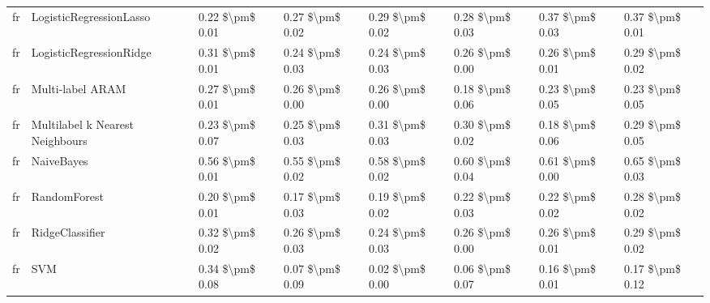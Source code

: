 \begin{tabular}{llllllll}
      fr &         LogisticRegressionLasso &     0.22 \$\textbackslash pm\$ 0.01 &           0.27 \$\textbackslash pm\$ 0.02 &       0.29 \$\textbackslash pm\$ 0.02 &        0.28 \$\textbackslash pm\$ 0.03 &                         0.37 \$\textbackslash pm\$ 0.03 &     0.37 \$\textbackslash pm\$ 0.01 \\
      fr &         LogisticRegressionRidge &     0.31 \$\textbackslash pm\$ 0.01 &           0.24 \$\textbackslash pm\$ 0.03 &       0.24 \$\textbackslash pm\$ 0.03 &        0.26 \$\textbackslash pm\$ 0.00 &                         0.26 \$\textbackslash pm\$ 0.01 &     0.29 \$\textbackslash pm\$ 0.02 \\
      fr &                Multi-label ARAM &     0.27 \$\textbackslash pm\$ 0.01 &           0.26 \$\textbackslash pm\$ 0.00 &       0.26 \$\textbackslash pm\$ 0.00 &        0.18 \$\textbackslash pm\$ 0.06 &                         0.23 \$\textbackslash pm\$ 0.05 &     0.23 \$\textbackslash pm\$ 0.05 \\
      fr & Multilabel k Nearest Neighbours &     0.23 \$\textbackslash pm\$ 0.07 &           0.25 \$\textbackslash pm\$ 0.03 &       0.31 \$\textbackslash pm\$ 0.03 &        0.30 \$\textbackslash pm\$ 0.02 &                         0.18 \$\textbackslash pm\$ 0.06 &     0.29 \$\textbackslash pm\$ 0.05 \\
      fr &                      NaiveBayes &     0.56 \$\textbackslash pm\$ 0.01 &           0.55 \$\textbackslash pm\$ 0.02 &       0.58 \$\textbackslash pm\$ 0.02 &        0.60 \$\textbackslash pm\$ 0.04 &                         0.61 \$\textbackslash pm\$ 0.00 &     0.65 \$\textbackslash pm\$ 0.03 \\
      fr &                    RandomForest &     0.20 \$\textbackslash pm\$ 0.01 &           0.17 \$\textbackslash pm\$ 0.03 &       0.19 \$\textbackslash pm\$ 0.02 &        0.22 \$\textbackslash pm\$ 0.03 &                         0.22 \$\textbackslash pm\$ 0.02 &     0.28 \$\textbackslash pm\$ 0.02 \\
      fr &                 RidgeClassifier &     0.32 \$\textbackslash pm\$ 0.02 &           0.26 \$\textbackslash pm\$ 0.03 &       0.24 \$\textbackslash pm\$ 0.03 &        0.26 \$\textbackslash pm\$ 0.00 &                         0.26 \$\textbackslash pm\$ 0.01 &     0.29 \$\textbackslash pm\$ 0.02 \\
      fr &                             SVM &     0.34 \$\textbackslash pm\$ 0.08 &           0.07 \$\textbackslash pm\$ 0.09 &       0.02 \$\textbackslash pm\$ 0.00 &        0.06 \$\textbackslash pm\$ 0.07 &                         0.16 \$\textbackslash pm\$ 0.01 &     0.17 \$\textbackslash pm\$ 0.12 \\

\end{tabular}
